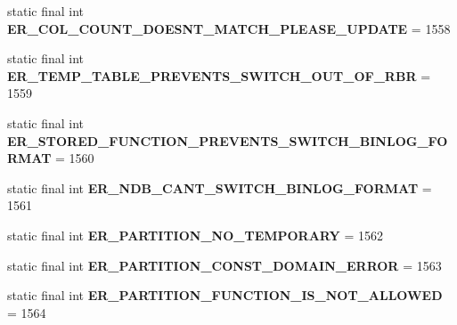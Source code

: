 \begin{DoxyCompactItemize}
static final int {\bfseries E\+R\+\_\+\+C\+O\+L\+\_\+\+C\+O\+U\+N\+T\+\_\+\+D\+O\+E\+S\+N\+T\+\_\+\+M\+A\+T\+C\+H\+\_\+\+P\+L\+E\+A\+S\+E\+\_\+\+U\+P\+D\+A\+TE} = 1558
\item 
\mbox{\label{classcom_1_1mysql_1_1cj_1_1exceptions_1_1_mysql_error_numbers_ac3ec6ebfeffb4b01c361b7607b71b9a2}} 
static final int {\bfseries E\+R\+\_\+\+T\+E\+M\+P\+\_\+\+T\+A\+B\+L\+E\+\_\+\+P\+R\+E\+V\+E\+N\+T\+S\+\_\+\+S\+W\+I\+T\+C\+H\+\_\+\+O\+U\+T\+\_\+\+O\+F\+\_\+\+R\+BR} = 1559
\item 
\mbox{\label{classcom_1_1mysql_1_1cj_1_1exceptions_1_1_mysql_error_numbers_ab19da9acad7a3ded70e0bb3f3b0519eb}} 
static final int {\bfseries E\+R\+\_\+\+S\+T\+O\+R\+E\+D\+\_\+\+F\+U\+N\+C\+T\+I\+O\+N\+\_\+\+P\+R\+E\+V\+E\+N\+T\+S\+\_\+\+S\+W\+I\+T\+C\+H\+\_\+\+B\+I\+N\+L\+O\+G\+\_\+\+F\+O\+R\+M\+AT} = 1560
\item 
\mbox{\label{classcom_1_1mysql_1_1cj_1_1exceptions_1_1_mysql_error_numbers_ae1048fa2ae77820e86e18fbad1231360}} 
static final int {\bfseries E\+R\+\_\+\+N\+D\+B\+\_\+\+C\+A\+N\+T\+\_\+\+S\+W\+I\+T\+C\+H\+\_\+\+B\+I\+N\+L\+O\+G\+\_\+\+F\+O\+R\+M\+AT} = 1561
\item 
\mbox{\label{classcom_1_1mysql_1_1cj_1_1exceptions_1_1_mysql_error_numbers_a20c58455d06e89e4a1b8bce2147a4375}} 
static final int {\bfseries E\+R\+\_\+\+P\+A\+R\+T\+I\+T\+I\+O\+N\+\_\+\+N\+O\+\_\+\+T\+E\+M\+P\+O\+R\+A\+RY} = 1562
\item 
\mbox{\label{classcom_1_1mysql_1_1cj_1_1exceptions_1_1_mysql_error_numbers_aef10cc7164594cfe405db953757673b1}} 
static final int {\bfseries E\+R\+\_\+\+P\+A\+R\+T\+I\+T\+I\+O\+N\+\_\+\+C\+O\+N\+S\+T\+\_\+\+D\+O\+M\+A\+I\+N\+\_\+\+E\+R\+R\+OR} = 1563
\item 
\mbox{\label{classcom_1_1mysql_1_1cj_1_1exceptions_1_1_mysql_error_numbers_a34bffb6882578450e91b126493ed46ae}} 
static final int {\bfseries E\+R\+\_\+\+P\+A\+R\+T\+I\+T\+I\+O\+N\+\_\+\+F\+U\+N\+C\+T\+I\+O\+N\+\_\+\+I\+S\+\_\+\+N\+O\+T\+\_\+\+A\+L\+L\+O\+W\+ED} = 1564

\end{DoxyCompactItemize}
